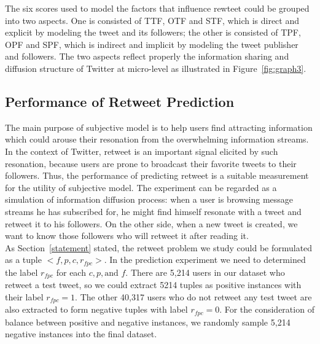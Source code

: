 \documentclass[preprint,times]{elsarticle}
\begin{document}
The six scores used to model the factors that influence rewteet could be grouped into two aspects. 
One is consisted of TTF, OTF and STF, which is direct and explicit by modeling the tweet and its followers;
the other is consisted of TPF, OPF and SPF, which is indirect and implicit by modeling the tweet publisher and followers.
The two aspects reflect properly the information sharing and diffusion structure of Twitter at micro-level as illustrated in Figure~\ref{fig:graph3}.
\subsection{Performance of Retweet Prediction }
\label{performance}
The main purpose of subjective model is to help users find attracting information which could arouse their resonation from the overwhelming information streams. 
In the context of Twitter, retweet is an important signal elicited by such resonation, because users are prone to broadcast their favorite tweets to their followers. 
Thus, the performance of predicting retweet is a suitable measurement for the utility of subjective model. The experiment can be regarded as a simulation of information diffusion process: when a user is browsing message streams he has subscribed for, he might find himself resonate with a tweet and retweet it to his followers. On the other side, when a new tweet is created, we want to know those followers who will retweet it after reading it.\\
As Section~\ref{statement} stated, the retweet problem we study could be formulated as a tuple $< f, p, c, r_{fpc}> $.
In the prediction experiment we need to determined the label $ r_{fpc} $ for each $ c, p, \text{and } f $. 
There are 5,214 users in our dataset who retweet a test tweet, so we could extract 5214 tuples as positive instances with their label $ r_{fpc}=1 $.
The other 40,317 users who do not retweet any test tweet are also extracted to form negative tuples with label $ r_{fpc}=0 $.
For the consideration of balance between positive and negative instances, we randomly sample 5,214 negative instances into the final dataset.
\end{document}
